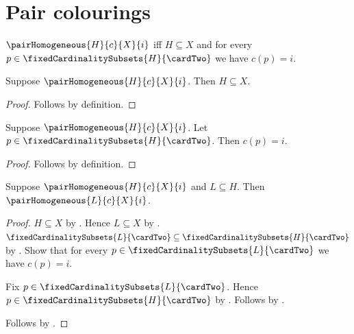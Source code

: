 \section{Pair colourings}




\begin{definition}\label{pair_homogeneous}
    $\pairHomogeneous{H}{c}{X}{i}$ iff $H\subseteq X$ and
        for every $p\in\fixedCardinalitySubsets{H}{\cardTwo}$ we have
            $c(p)=i$.
\end{definition}

\begin{proposition}\label{pair_homogeneous_subseteq}
    Suppose $\pairHomogeneous{H}{c}{X}{i}$.
    Then $H\subseteq X$.
\end{proposition}
\begin{proof}
    Follows by definition.
\end{proof}

\begin{proposition}\label{pair_homogeneous_colour}
    Suppose $\pairHomogeneous{H}{c}{X}{i}$.
    Let $p\in\fixedCardinalitySubsets{H}{\cardTwo}$.
    Then $c(p)=i$.
\end{proposition}
\begin{proof}
    Follows by definition.
\end{proof}

\begin{proposition}\label{pair_homogeneous_hereditary}
    Suppose $\pairHomogeneous{H}{c}{X}{i}$ and $L\subseteq H$.
    Then $\pairHomogeneous{L}{c}{X}{i}$.
\end{proposition}
\begin{proof}
    $H\subseteq X$ by .
    Hence $L\subseteq X$ by .
    $\fixedCardinalitySubsets{L}{\cardTwo}
        \subseteq\fixedCardinalitySubsets{H}{\cardTwo}$ by
        .
    Show that for every $p\in\fixedCardinalitySubsets{L}{\cardTwo}$
        we have $c(p)=i$.
    \begin{subproof}
        Fix $p\in\fixedCardinalitySubsets{L}{\cardTwo}$.
        Hence $p\in\fixedCardinalitySubsets{H}{\cardTwo}$ by
            .
        Follows by .
    \end{subproof}
    Follows by .
\end{proof}
